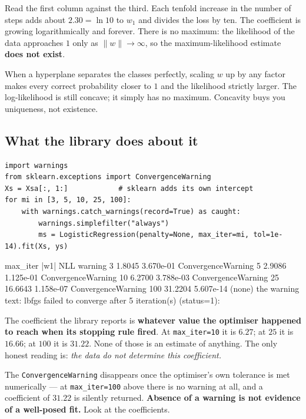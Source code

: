 \documentclass[11pt]{article}
\begin{document}
Read the first column against the third. Each tenfold increase in the number
of steps adds about $2.30 = \ln 10$ to $w_1$ and divides the loss by ten. The
coefficient is growing logarithmically and forever. There is no maximum: the
likelihood of the data approaches $1$ only as $\lVert w \rVert \to \infty$, so
the maximum-likelihood estimate \textbf{does not exist}.

\begin{keyidea}
When a hyperplane separates the classes perfectly, scaling $w$ up by any
factor makes every correct probability closer to $1$ and the likelihood
strictly larger. The log-likelihood is still concave; it simply has no
maximum. Concavity buys you uniqueness, not existence.
\end{keyidea}

\subsection{What the library does about it}

\begin{lstlisting}
import warnings
from sklearn.exceptions import ConvergenceWarning
Xs = Xsa[:, 1:]            # sklearn adds its own intercept
for mi in [3, 5, 10, 25, 100]:
    with warnings.catch_warnings(record=True) as caught:
        warnings.simplefilter("always")
        ms = LogisticRegression(penalty=None, max_iter=mi, tol=1e-14).fit(Xs, ys)
\end{lstlisting}
\begin{codeout}
max_iter   |w1|        NLL          warning
       3     1.8045  3.670e-01    ConvergenceWarning
       5     2.9086  1.125e-01    ConvergenceWarning
      10     6.2700  3.788e-03    ConvergenceWarning
      25    16.6643  1.158e-07    ConvergenceWarning
     100    31.2204  5.607e-14    (none)
the warning text: lbfgs failed to converge after 5 iteration(s) (status=1):
\end{codeout}

The coefficient the library reports is \textbf{whatever value the optimiser
happened to reach when its stopping rule fired}. At \texttt{max\_iter=10} it
is $6.27$; at $25$ it is $16.66$; at $100$ it is $31.22$. None of those is an
estimate of anything. The only honest reading is: \emph{the data do not
determine this coefficient.}

\begin{caution}
The \texttt{ConvergenceWarning} disappears once the optimiser's own tolerance
is met numerically --- at \texttt{max\_iter=100} above there is no warning at
all, and a coefficient of $31.22$ is silently returned. \textbf{Absence of a
warning is not evidence of a well-posed fit.} Look at the coefficients.
\end{caution}
\end{document}
